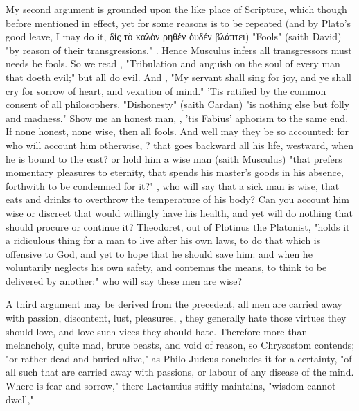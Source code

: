 My second argument is grounded upon the like place of Scripture, which though
before mentioned in effect, yet for some reasons is to be repeated (and by
Plato's good leave, I may do it, \textgreek{δίς τὸ καλὸν
ρηθέν ὀυδέν βλάπτει}) "Fools" (saith David) "by reason of their
transgressions." \etc{} . Hence Musculus infers
all transgressors must needs be fools. So we read ,
"Tribulation and anguish on the soul of every man that doeth evil;" but all do
evil. And , "My servant shall sing for joy, and
ye shall cry for sorrow of heart, and vexation of mind."
'Tis ratified by the common consent of all philosophers. "Dishonesty" (saith
Cardan) "is nothing else but folly and madness."  Show me an honest man,
, 'tis Fabius' aphorism to the same end. If none
honest, none wise, then all fools. And well may they be so accounted: for who
will account him otherwise, ? that goes backward all his life, westward, when he is bound to
the east? or hold him a wise man (saith Musculus) "that
prefers momentary pleasures to eternity, that spends his master's goods in his
absence, forthwith to be condemned for it?" , who will say that a sick man is wise, that eats and drinks to overthrow
the temperature of his body? Can you account him wise or discreet that would
willingly have his health, and yet will do nothing that should procure or
continue it? Theodoret, out of Plotinus the Platonist,
"holds it a ridiculous thing for a man to live after his own laws, to do that
which is offensive to God, and yet to hope that he should save him: and when he
voluntarily neglects his own safety, and contemns the means, to think to be
delivered by another:" who will say these men are wise?

A third argument may be derived from the precedent, all men
are carried away with passion, discontent, lust, pleasures, \etc{}, they
generally hate those virtues they should love, and love such vices they should
hate. Therefore more than melancholy, quite mad, brute beasts, and void of
reason, so Chrysostom contends; "or rather dead and buried alive," as
Philo Judeus concludes it for a certainty, "of all such
that are carried away with passions, or labour of any disease of the mind.
Where is fear and sorrow," there Lactantius stiffly
maintains, "wisdom cannot dwell,"


